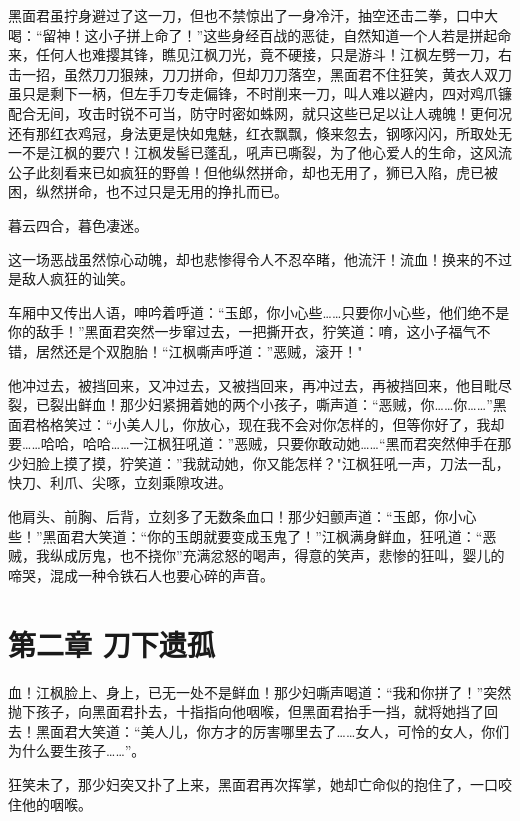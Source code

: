 \documentclass[12pt,oneside]{book}
\begin{document}
黑面君虽拧身避过了这一刀，但也不禁惊出了一身冷汗，抽空还击二拳，口中大喝：``留神！这小子拼上命了！''这些身经百战的恶徒，自然知道一个人若是拼起命来，任何人也难撄其锋，瞧见江枫刀光，竟不硬接，只是游斗！江枫左劈一刀，右击一招，虽然刀刀狠辣，刀刀拼命，但却刀刀落空，黑面君不住狂笑，黄衣人双刀虽只是剩下一柄，但左手刀专走偏锋，不时削来一刀，叫人难以避内，四对鸡爪镰配合无间，攻击时锐不可当，防守时密如蛛网，就只这些已足以让人魂魄！更何况还有那红衣鸡冠，身法更是快如鬼魅，红衣飘飘，倏来忽去，钢啄闪闪，所取处无一不是江枫的要穴！江枫发髻已蓬乱，吼声已嘶裂，为了他心爱人的生命，这风流公子此刻看来已如疯狂的野兽！但他纵然拼命，却也无用了，狮已入陷，虎已被困，纵然拼命，也不过只是无用的挣扎而已。

暮云四合，暮色凄迷。

这一场恶战虽然惊心动魄，却也悲惨得令人不忍卒睹，他流汗！流血！换来的不过是敌人疯狂的讪笑。

车厢中又传出人语，呻吟着呼道：``玉郎，你小心些\ldots\ldots 只要你小心些，他们绝不是你的敌手！''黑面君突然一步窜过去，一把撕开衣，狞笑道：唷，这小子福气不错，居然还是个双胞胎！``江枫嘶声呼道：''恶贼，滚开！"

他冲过去，被挡回来，又冲过去，又被挡回来，再冲过去，再被挡回来，他目毗尽裂，已裂出鲜血！那少妇紧拥着她的两个小孩子，嘶声道：``恶贼，你\ldots\ldots 你\ldots\ldots{}''黑面君格格笑过：``小美人儿，你放心，现在我不会对你怎样的，但等你好了，我却要\ldots\ldots 哈哈，哈哈\ldots\ldots 一江枫狂吼道：''恶贼，只要你敢动她\ldots\ldots{}``黑而君突然伸手在那少妇脸上摸了摸，狞笑道：''我就动她，你又能怎样？"江枫狂吼一声，刀法一乱，快刀、利爪、尖啄，立刻乘隙攻进。

他肩头、前胸、后背，立刻多了无数条血口！那少妇颤声道：``玉郎，你小心些！''黑面君大笑道：``你的玉朗就要变成玉鬼了！''江枫满身鲜血，狂吼道：``恶贼，我纵成厉鬼，也不挠你''充满忿怒的喝声，得意的笑声，悲惨的狂叫，婴儿的啼哭，混成一种令铁石人也要心碎的声音。

\hypertarget{ux7b2cux4e8cux7ae0-ux5200ux4e0bux9057ux5b64}{%
\chapter{第二章
刀下遗孤}\label{ux7b2cux4e8cux7ae0-ux5200ux4e0bux9057ux5b64}}

血！江枫脸上、身上，已无一处不是鲜血！那少妇嘶声喝道：``我和你拼了！''突然抛下孩子，向黑面君扑去，十指指向他咽喉，但黑面君抬手一挡，就将她挡了回去！黑面君大笑道：``美人儿，你方才的厉害哪里去了\ldots\ldots 女人，可怜的女人，你们为什么要生孩子\ldots\ldots{}''。

狂笑未了，那少妇突又扑了上来，黑面君再次挥掌，她却亡命似的抱住了，一口咬住他的咽喉。
\end{document}
